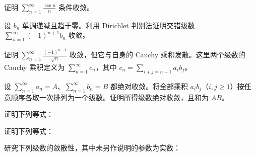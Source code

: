 \newpage
\noindent\begin{minipage}{\textwidth}
证明 $\displaystyle\sum_{n=1}^{\infty}\frac{\cos n}{n}$ 条件收敛。
\end{minipage}\par\vfill
\noindent\begin{minipage}{\textwidth}
设 $b_n$ 单调递减且趋于零。利用 Dirichlet 判别法证明交错级数 $\sum_{n=1}^{\infty}(-1)^{n+1}b_n$ 收敛。
\end{minipage}\par\vfill
\noindent\begin{minipage}{\textwidth}
证明 $\displaystyle\sum_{n=1}^{\infty}\frac{(-1)^{n-1}}{\sqrt n}$ 收敛，但它与自身的 Cauchy 乘积发散。这里两个级数的 Cauchy 乘积定义为 $\sum_{n=1}^{\infty}c_n$，其中 $c_n=\sum_{i+j=n+1}a_i b_j$。
\end{minipage}\par\vfill
\noindent\begin{minipage}{\textwidth}
设 $\sum_{n=1}^{\infty}a_n=A$、$\sum_{n=1}^{\infty}b_n=B$ 都绝对收敛。将全部乘积 $a_i b_j$（$i,j\ge1$）按任意顺序各取一次排列为一个级数。证明所得级数绝对收敛，且和为 $AB$。
\end{minipage}\par\vfill
\newpage
\noindent\begin{minipage}{\textwidth}
证明下列等式：
\end{minipage}\par\vfill
\noindent\begin{minipage}{\textwidth}
证明下列等式：
\end{minipage}\par\vfill
\noindent\begin{minipage}{\textwidth}
研究下列级数的敛散性，其中未另作说明的参数为实数：
\end{minipage}\par\vfill
